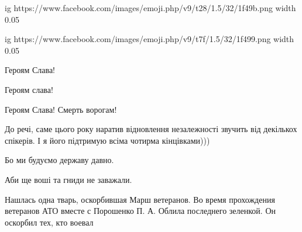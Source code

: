 \begin{itemize}
\ifcmt
  ig https://www.facebook.com/images/emoji.php/v9/t28/1.5/32/1f49b.png
  width 0.05

	ig https://www.facebook.com/images/emoji.php/v9/t7f/1.5/32/1f499.png
  width 0.05
\fi

 
Героям Слава!

 
Героям слава!

 
Героям Слава! Смерть ворогам!

 

До речі, саме цього року наратив відновлення незалежності звучить від декількох
спікерів. І я його підтримую всіма чотирма кінцівками)))

Бо ми будуємо державу давно.

Аби ще воші та гниди не заважали.

 

Нашлась одна тварь, оскорбившая Марш ветеранов. Во время прохождения ветеранов
АТО вместе с Порошенко П. А. Облила последнего зеленкой. Он оскорбил тех, кто
воевал

\begin{itemize}
 

\end{itemize}
\end{itemize}
